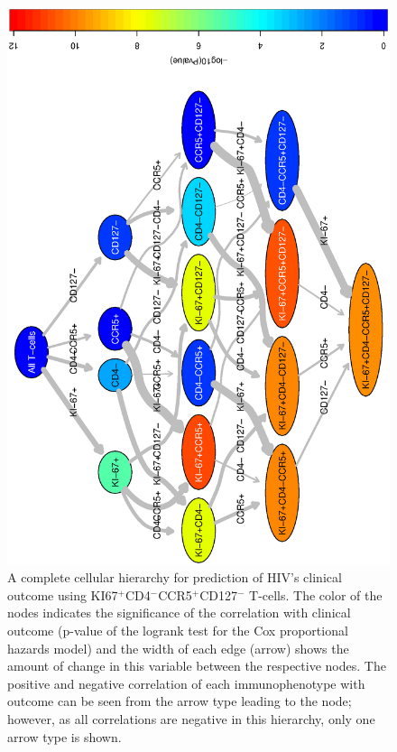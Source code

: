  \begin{landscape}
    \begin{figure}[ht]
      \begin{center}
        \includegraphics[width=13cm, angle=270]{figs/rchy/figs/HIVClinicalOutcomeComplete}
      \end{center}
      \caption{A complete cellular hierarchy for prediction of HIV's clinical outcome using KI67$^+$CD4$^-$CCR5$^+$CD127$^-$ T-cells. 
      The color of the nodes indicates the significance of the correlation with clinical outcome (p-value of the logrank test for the Cox proportional hazards model) and the width of each edge (arrow) shows the amount of change in this variable between the respective nodes.
        The positive and negative correlation of each immunophenotype with outcome can be seen from the arrow type leading to the node; however, as all correlations are negative in this hierarchy, only one arrow type is shown. 
      }
      \label{r1:HIVClinicalOutcomeComplete}
    \end{figure}
  \end{landscape}

